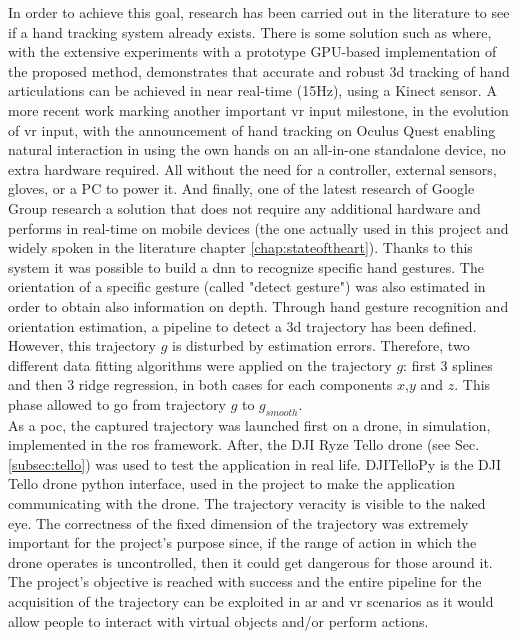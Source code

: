 \noindent In order to achieve this goal, research has been carried out in the literature to see if a hand tracking system already exists. There is some solution such as \cite[]{oikonomidis2011efficient} where, with the extensive experiments with a prototype GPU-based implementation of the proposed method, demonstrates that accurate and robust \gls{3d} tracking of hand articulations can be achieved in near real-time (15Hz), using a Kinect sensor. A more recent work \cite[]{OculusCo32:online} marking another important \gls{vr} input milestone, in the evolution of \gls{vr} input, with the announcement of hand tracking on Oculus Quest enabling natural interaction in using the own hands on an all-in-one standalone device, no extra hardware required. All without the need for a controller, external sensors, gloves, or a PC to power it. And finally, one of the latest research of Google Group research \cite[]{zhang2020mediapipe} a solution that does not require any additional hardware and performs in real-time on mobile devices (the one actually used in this project and widely spoken in the literature chapter \ref{chap:stateoftheart}). Thanks to this system it was possible to build a \gls{dnn} to recognize specific hand gestures. The orientation of a specific gesture (called "detect gesture") was also estimated in order to obtain also information on depth. Through hand gesture recognition and orientation estimation, a pipeline to detect a \gls{3d} trajectory has been defined. However, this trajectory $g$ is disturbed by estimation errors. Therefore, two different data fitting algorithms were applied on the trajectory $g$: first $3$ splines and then $3$ ridge regression, in both cases for each components $x$,$y$ and $z$. This phase allowed to go from trajectory $g$ to $g_{smooth}$. \\

\noindent As a \gls{poc}, the captured trajectory was launched first on a drone, in simulation, implemented in the \gls{ros} framework. After, the DJI Ryze Tello drone (see Sec. \ref{subsec:tello}) was used to test the application in real life. DJITelloPy is the DJI Tello drone python interface, used in the project to make the application communicating with the drone. The trajectory veracity is visible to the naked eye. The correctness of the fixed dimension of the trajectory was extremely important for the project’s purpose since, if the range of action in which the drone operates is uncontrolled, then it could get dangerous for those around it. \\

\noindent The project's objective is reached with success and the entire pipeline for the acquisition of the trajectory can be exploited in \gls{ar} and \gls{vr} scenarios as it would allow people to interact with virtual objects and/or perform actions.